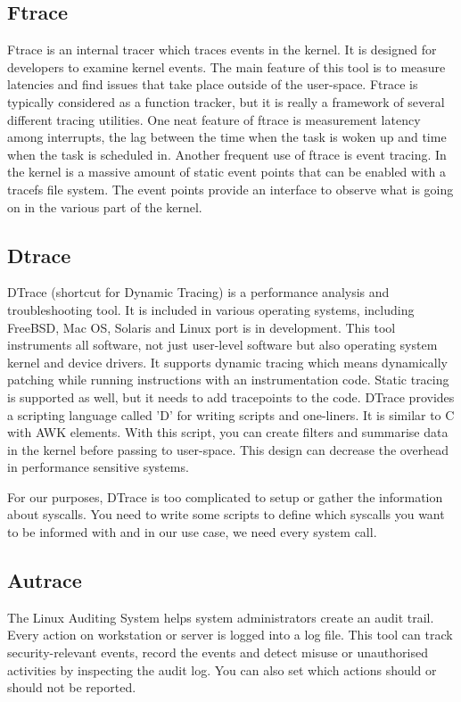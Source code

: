 \subsection{Ftrace}
Ftrace\cite{ftrace_man} is an internal tracer which traces events in the kernel.
It is designed for developers to examine kernel events.
The main feature of this tool is to measure latencies and find issues that take place outside of the user-space.
Ftrace is typically considered as a function tracker,
but it is really a framework of several different tracing utilities.
One neat feature of ftrace is measurement latency among interrupts, the lag between the time when the task is woken up and time when the task is scheduled in.
Another frequent use of ftrace is event tracing.
In the kernel is a massive amount of static event points that can be enabled with a tracefs file system.
The event points provide an interface to observe what is going on in the various part of the kernel.

\subsection{Dtrace}
DTrace\cite{dtrace_man}\cite{dtrace_about} (shortcut for Dynamic Tracing) is a performance analysis and troubleshooting tool.
It is included in various operating systems, including FreeBSD, Mac OS, Solaris and Linux port is in development.
This tool instruments all software, not just user-level software but also operating system kernel and device drivers.
It supports dynamic tracing which means dynamically patching while running instructions with an instrumentation code.
Static tracing is supported as well, but it needs to add tracepoints to the code.
DTrace provides a scripting language called 'D' for writing scripts and one-liners.
It is similar to C with AWK elements.
With this script, you can create filters and summarise data in the kernel before passing to user-space.
This design can decrease the overhead in performance sensitive systems.

For our purposes, DTrace is too complicated to setup or gather the information about syscalls.
You need to write some scripts to define which syscalls you want to be informed with and in our use case, we need every system call.

\subsection{Autrace}
The Linux Auditing System helps system administrators create an audit trail.
Every action on workstation or server is logged into a log file.
This tool can track security-relevant events, record the events and detect misuse or unauthorised activities by inspecting the audit log.
You can also set which actions should or should not be reported.

